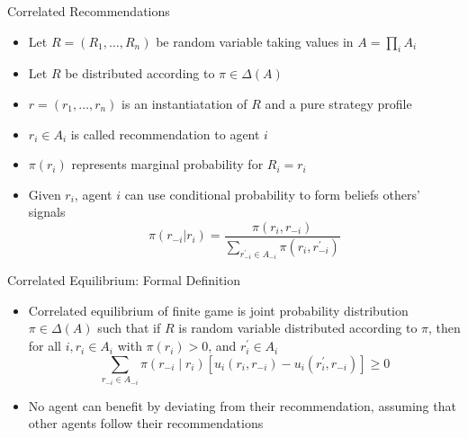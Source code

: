 \documentclass[11pt,aspectratio=169]{beamer}
\begin{document}
  \begin{frame}{Correlated Recommendations}
   \begin{itemize}[<+->]
    \setlength{\itemsep}{0.56em}
    \item Let $R=(R_1,\dots,R_n)$ be random variable taking values in $A=\prod_i A_i$
    \item Let $R$ be distributed according to $\pi \in \Delta(A)$
    \item $r = (r_1, \dots, r_n)$ is an instantiatation of $R$ and a pure strategy profile
    \item $r_i \in A_i$ is called \alert{recommendation to agent $i$}
    \item $\pi(r_i)$ represents marginal probability for $R_i = r_i$
    \item Given $r_i$, agent $i$ can use conditional probability to form beliefs others' signals
    $$\pi(r_{-i} | r_i) = \frac{\pi(r_i, r_{-i})}{\sum_{r^{\prime}_{-i}\in A_{-i}}\pi(r_i,r^{\prime}_{-i})}$$
   \end{itemize}
  \end{frame}

  \begin{frame}{Correlated Equilibrium: Formal Definition}
   \begin{itemize}[<+->]
    \item \alert{Correlated equilibrium} of finite game is joint probability distribution $\pi \in \Delta(A)$ such that if $R$ is random variable distributed according to $\pi$, then for all $i, r_i \in A_i$ with $\pi(r_i) > 0$, and $r^{\prime}_i \in A_i$
    $$
     \sum_{r_{-i} \in A_{-i}} \pi(r_{-i} \mid r_i) \left[u_i(r_i, r_{-i}) - u_i(r^{\prime}_i, r_{-i})\right]  \ge 0
    $$
    \item No agent can benefit by deviating from their recommendation, assuming that other agents follow their recommendations
   \end{itemize}
  \end{frame}
\end{document}
